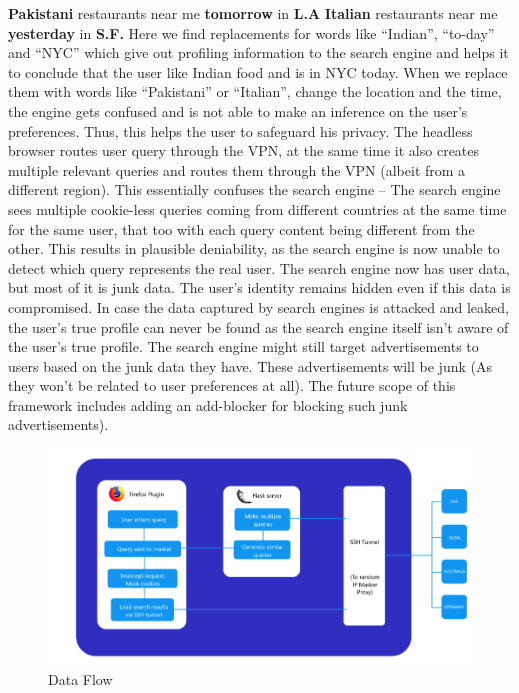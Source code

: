 \documentclass[10pt, a4paper, twocolumn]{article} %
\begin{document}
\textbf{Pakistani} restaurants near me \textbf{tomorrow} in \textbf{L.A}\newline
\textbf{Italian} restaurants near me \textbf{yesterday} in \textbf{S.F.} \newline
Here we find replacements for words like “Indian”, “to-day” and “NYC” which give out profiling information to the search engine and helps it to conclude that the user like Indian food and is in NYC today. When we replace them with words like “Pakistani” or “Italian”, change the location and the time, the engine gets confused and is not able to make an inference on the user’s preferences. Thus, this helps the user to safeguard his privacy.\newline
The headless browser routes user query through the VPN, at the same time it also creates multiple relevant queries and routes them through the VPN (albeit from a different region). This essentially confuses the search engine – The search engine sees multiple cookie-less queries coming from different countries at the same time for the same user, that too with each query content being different from the other. This results in plausible deniability, as the search engine is now unable to detect which query represents the real user. The search engine now has user data, but most of it is junk data. The user’s identity remains hidden even if this data is compromised. In case the data captured by search engines is attacked and leaked, the user’s true profile can never be found as the search engine itself isn’t aware of the user’s true profile. The search engine might still target advertisements to users based on the junk data they have. These advertisements will be junk (As they won’t be related to user preferences at all). The future scope of this framework includes adding an add-blocker for blocking such junk advertisements).
\begin{figure}
	\includegraphics[width=\linewidth]{Flow.png} %
	\caption{Data Flow} %
	\label{Flow} %
\end{figure}
\end{document}
